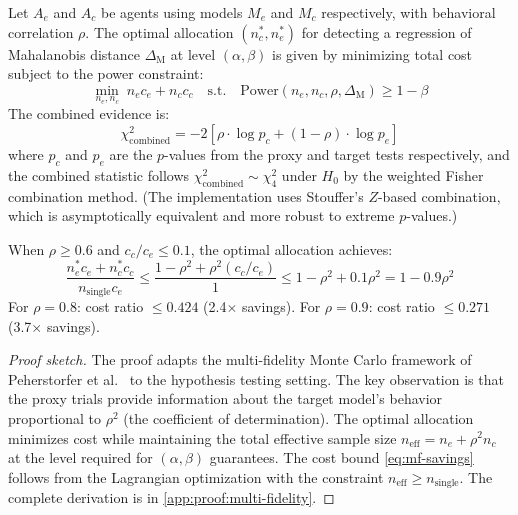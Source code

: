 \begin{proposition}
\label{prop:multi-fidelity}
Let $A_e$ and $A_c$ be agents using models $M_e$ and $M_c$
respectively, with behavioral correlation $\rho$. The optimal
allocation $(n_c^*, n_e^*)$ for detecting a regression of
Mahalanobis distance $\Delta_{\mathrm{M}}$ at level $(\alpha, \beta)$
is given by minimizing total cost subject to the power constraint:
\begin{equation}
\label{eq:mf-optimization}
  \min_{n_e, n_c}\; n_e c_e + n_c c_c
  \quad\text{s.t.}\quad
  \mathrm{Power}(n_e, n_c, \rho, \Delta_{\mathrm{M}}) \geq 1 - \beta
\end{equation}
The combined evidence is:
\begin{equation}
\label{eq:mf-combined}
  \chi^2_{\mathrm{combined}} = -2\!\left[
    \rho \cdot \log p_c + (1-\rho) \cdot \log p_e
  \right]
\end{equation}
where $p_c$ and $p_e$ are the $p$-values from the proxy and target
tests respectively, and the combined statistic follows
$\chi^2_{\mathrm{combined}} \sim \chi^2_4$ under $H_0$ by the weighted
Fisher combination method. (The implementation uses Stouffer's $Z$-based
combination, which is asymptotically equivalent and more robust to
extreme $p$-values.)

When $\rho \geq 0.6$ and $c_c / c_e \leq 0.1$, the optimal
allocation achieves:
\begin{equation}
\label{eq:mf-savings}
  \frac{n_e^* c_e + n_c^* c_c}{n_{\mathrm{single}} c_e}
  \leq \frac{1 - \rho^2 + \rho^2 (c_c / c_e)}{1}
  \leq 1 - \rho^2 + 0.1\rho^2
  = 1 - 0.9\rho^2
\end{equation}
For $\rho = 0.8$: cost ratio $\leq 0.424$ (2.4$\times$ savings). For
$\rho = 0.9$: cost ratio $\leq 0.271$ (3.7$\times$ savings).
\end{proposition}

\begin{proof}[Proof sketch]
The proof adapts the multi-fidelity Monte Carlo framework of
Peherstorfer et al.~\citep{peherstorfer2018survey} to the hypothesis
testing setting. The key observation is that the proxy trials provide
information about the target model's behavior proportional to $\rho^2$
(the coefficient of determination). The optimal allocation minimizes
cost while maintaining the total effective sample size
$n_{\mathrm{eff}} = n_e + \rho^2 n_c$ at the level required for
$(\alpha, \beta)$ guarantees. The cost bound
\eqref{eq:mf-savings} follows from the Lagrangian optimization with
the constraint $n_{\mathrm{eff}} \geq n_{\mathrm{single}}$.
The complete derivation is in \cref{app:proof:multi-fidelity}.
\end{proof}

